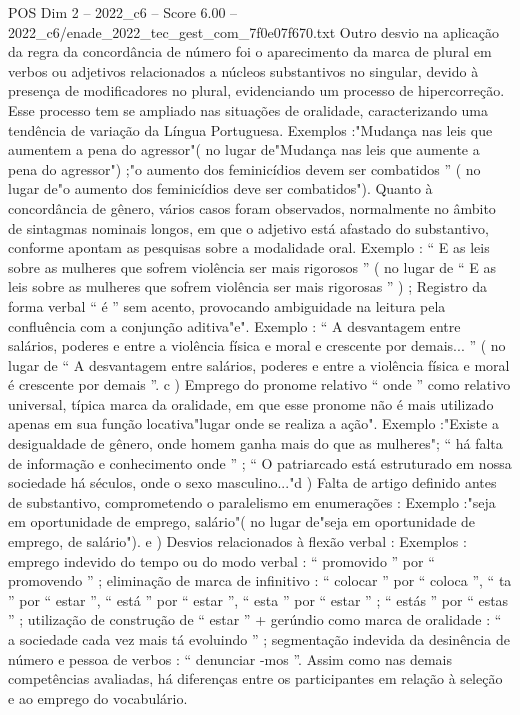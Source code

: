 \begin{textsample}{POS Dim 2 – 2022\_c6 – Score 6.00 – 2022\_c6/enade\_2022\_tec\_gest\_com\_7f0e07f670.txt}
Outro desvio na aplicação da regra da concordância de número foi o aparecimento da marca de plural em verbos ou adjetivos relacionados a núcleos substantivos no singular, devido à presença de modificadores no plural, evidenciando um processo de hipercorreção.
Esse processo tem se ampliado nas situações de oralidade, caracterizando uma tendência de variação da Língua Portuguesa.
Exemplos :"Mudança nas leis que aumentem a pena do agressor"( no lugar de"Mudança nas leis que aumente a pena do agressor") ;"o aumento dos feminicídios devem ser combatidos ” ( no lugar de"o aumento dos feminicídios deve ser combatidos").
Quanto à concordância de gênero, vários casos foram observados, normalmente no âmbito de sintagmas nominais longos, em que o adjetivo está afastado do substantivo, conforme apontam as pesquisas sobre a modalidade oral.
Exemplo : “ E as leis sobre as mulheres que sofrem violência ser mais rigorosos ” ( no lugar de “ E as leis sobre as mulheres que sofrem violência ser mais rigorosas ” ) ; Registro da forma verbal “ é ” sem acento, provocando ambiguidade na leitura pela confluência com a conjunção aditiva"e".
Exemplo : “ A desvantagem entre salários, poderes e entre a violência física e moral e crescente por demais... ” ( no lugar de “ A desvantagem entre salários, poderes e entre a violência física e moral é crescente por demais ”. c ) Emprego do pronome relativo “ onde ” como relativo universal, típica marca da oralidade, em que esse pronome não é mais utilizado apenas em sua função locativa"lugar onde se realiza a ação".
Exemplo :"Existe a desigualdade de gênero, onde homem ganha mais do que as mulheres"; “ há falta de informação e conhecimento onde ” ; “ O patriarcado está estruturado em nossa sociedade há séculos, onde o sexo masculino..."d ) Falta de artigo definido antes de substantivo, comprometendo o paralelismo em enumerações : Exemplo :"seja em oportunidade de emprego, salário"( no lugar de"seja em oportunidade de emprego, de salário"). e ) Desvios relacionados à flexão verbal : Exemplos : emprego indevido do tempo ou do modo verbal : “ promovido ” por “ promovendo ” ; eliminação de marca de infinitivo : “ colocar ” por “ coloca ”, “ ta ” por “ estar ”, “ está ” por “ estar ”, “ esta ” por “ estar ” ; “ estás ” por “ estas ” ; utilização de construção de “ estar ” + gerúndio como marca de oralidade : “ a sociedade cada vez mais tá evoluindo ” ; segmentação indevida da desinência de número e pessoa de verbos : “ denunciar -mos ”.
Assim como nas demais competências avaliadas, há diferenças entre os participantes em relação à seleção e ao emprego do vocabulário.

\end{textsample}
